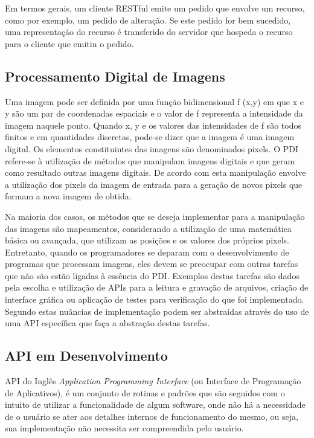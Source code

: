 \documentclass[12pt]{article}
\begin{document}
Em termos gerais, um cliente RESTful emite um pedido que envolve um recurso, como
por exemplo, um pedido de alteração. Se este pedido for bem sucedido, uma representação
do recurso é transferido do servidor que hospeda o recurso para o cliente que emitiu o
pedido.


\subsection{Processamento Digital de Imagens}

Uma imagem pode ser definida por uma função bidimensional f (x,y) em que x e y são um par de coordenadas espaciais e o valor de f representa a intensidade da
imagem naquele ponto. Quando x, y e os valores das intensidades de f são todos finitos e em quantidades discretas, pode-se dizer que a imagem é uma imagem
digital. Os elementos constituintes das imagens são denominados pixels. O PDI refere-se à utilização de métodos que manipulam imagens digitais e que geram
como resultado outras imagens digitais. De acordo com \cite{gonzalez:08} esta manipulação envolve a utilização dos pixels da imagem de entrada para a geração de novos pixels que formam a
nova imagem de obtida.

Na maioria dos casos, os métodos que se deseja implementar para a manipulação das imagens são mapeamentos, considerando a utilização de uma matemática
básica ou avançada, que utilizam as posições e os valores dos próprios pixels. Entretanto, quando os programadores se deparam com o desenvolvimento de
programas que processam imagens, eles devem se preocupar com outras tarefas que não são estão ligadas à essência do PDI. Exemplos destas tarefas são dados
pela escolha e utilização de APIs para a leitura e gravação de arquivos, criação de interface gráfica ou aplicação de testes para verificação do que foi
implementado. Segundo \cite{gonzalez:08,jain:89} estas nuâncias de implementação podem ser abstraídas através do uso de uma API específica que faça a abstração destas tarefas.

\subsection{API em Desenvolvimento}

API do Inglês \textit{Application Programming Interface} (ou Interface de Programação de Aplicativos), é um conjunto de rotinas e padrões que são seguidos com o intuito de utilizar a funcionalidade de algum software, onde não há a necessidade de o usuário se ater aos detalhes internos de funcionamento do mesmo, ou seja, sua implementação não necessita ser compreendida pelo usuário. 
\end{document}
